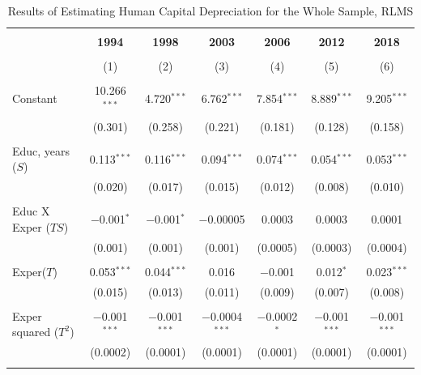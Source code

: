 \documentclass[alpha-refs]{wiley-article-02b}
\begin{document}




\setlength{\tabcolsep}{2pt}
\begin{table}[htbp!]
	\centering 
	\caption{Results of Estimating Human Capital Depreciation for the Whole Sample, RLMS} 
	\label{tab:1.1}
	\begin{tabular}{@{\extracolsep{3pt}}lcccccc} 
		\\[-1.8ex]\hline 
		\hline \\[-1.8ex] 
		& \textbf{1994} & \textbf{1998} & \textbf{2003} & \textbf{2006} & \textbf{2012} & \textbf{2018} \\ 
		\\[-1.8ex] & (1) & (2) & (3) & (4) & (5) & (6)\\ 
		\hline \\[-1.8ex] 
		Constant & 10.266$^{***}$ & 4.720$^{***}$ & 6.762$^{***}$ & 7.854$^{***}$ & 8.889$^{***}$ & 9.205$^{***}$ \\ 
		& (0.301) & (0.258) & (0.221) & (0.181) & (0.128) & (0.158) \\ 
		& & & & & & \\ 
		Educ, years ($S$) & 0.113$^{***}$ & 0.116$^{***}$ & 0.094$^{***}$ & 0.074$^{***}$ & 0.054$^{***}$ & 0.053$^{***}$ \\ 
		& (0.020) & (0.017) & (0.015) & (0.012) & (0.008) & (0.010) \\ 
		& & & & & & \\ 
		Educ X Exper ($TS$) & $-$0.001$^{*}$ & $-$0.001$^{*}$ & $-$0.00005 & 0.0003 & 0.0003 & 0.0001 \\ 
		& (0.001) & (0.001) & (0.001) & (0.0005) & (0.0003) & (0.0004) \\ 
		& & & & & & \\ 
		Exper($T$) & 0.053$^{***}$ & 0.044$^{***}$ & 0.016 & $-$0.001 & 0.012$^{*}$ & 0.023$^{***}$ \\ 
		& (0.015) & (0.013) & (0.011) & (0.009) & (0.007) & (0.008) \\ 
		& & & & & & \\ 
		Exper squared ($T^2$) & $-$0.001$^{***}$ & $-$0.001$^{***}$ & $-$0.0004$^{***}$ & $-$0.0002$^{*}$ & $-$0.001$^{***}$ & $-$0.001$^{***}$ \\ 
		& (0.0002) & (0.0001) & (0.0001) & (0.0001) & (0.0001) & (0.0001) \\ 
		& & & & & & \\ 

\end{tabular}
\end{table}
\end{document}
